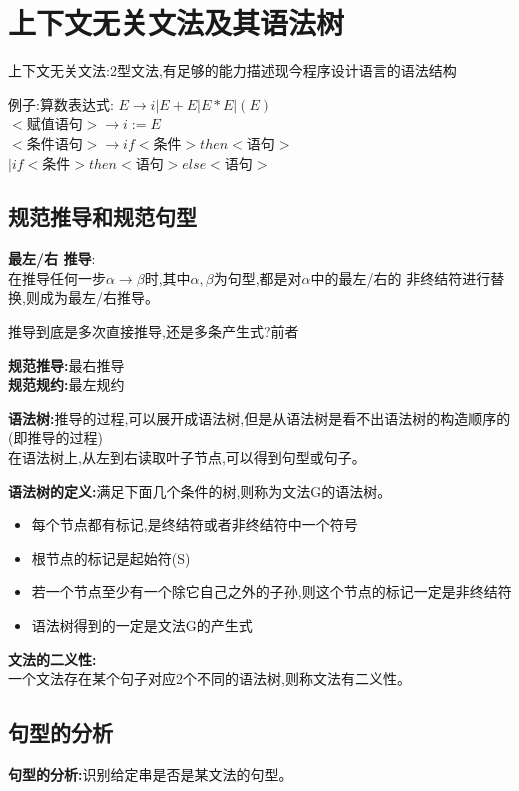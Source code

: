   \section{上下文无关文法及其语法树}
  上下文无关文法:2型文法,有足够的能力描述现今程序设计语言的语法结构

  例子:算数表达式:
  $E\to i|E+E|E*E|(E)$\\
  $<\text{赋值语句}> \to i := E$\\
  $<\text{条件语句}> \to if <\text{条件}> then <\text{语句}>$\\
  $| if <\text{条件}> then <\text{语句}> else <\text{语句}>$

  \subsection{规范推导和规范句型}
  \textbf{最左/右 推导}:\\
  在推导任何一步$\alpha\to \beta$时,其中$\alpha,\beta$为句型,都是对$\alpha$中的最左/右的
  非终结符进行替换,则成为最左/右推导。

  {\color{blue}推导到底是多次直接推导,还是多条产生式?前者}

  \textbf{规范推导:}最右推导\\
  \textbf{规范规约:}最左规约

  \textbf{语法树:}推导的过程,可以展开成语法树,但是从语法树是看不出语法树的构造顺序的(即推导的过程)\\
  在语法树上,从左到右读取叶子节点,可以得到句型或句子。

  \textbf{语法树的定义:}满足下面几个条件的树,则称为文法G的语法树。
  \begin{itemize}
    \item 每个节点都有标记,是终结符或者非终结符中一个符号
    \item 根节点的标记是起始符(S)
    \item 若一个节点至少有一个除它自己之外的子孙,则这个节点的标记一定是非终结符
    \item 语法树得到的一定是文法G的产生式
  \end{itemize}

  \textbf{文法的二义性:}\\
  一个文法存在某个句子对应2个不同的语法树,则称文法有二义性。

  \subsection{句型的分析}
  \textbf{句型的分析:}识别给定串是否是某文法的句型。

